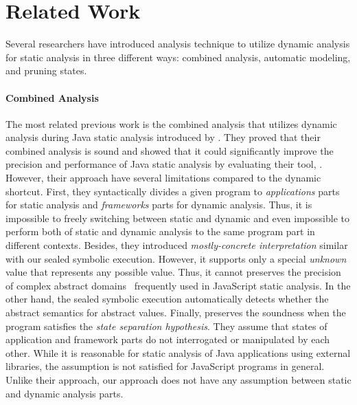\section{Related Work}\label{sec:related}

Several researchers have introduced analysis technique to utilize dynamic
analysis for static analysis in three different ways: combined analysis,
automatic modeling, and pruning states.


\paragraph{Combined Analysis}

The most related previous work is the combined analysis that utilizes dynamic
analysis during Java static analysis introduced by \citet{concerto}.  They
proved that their combined analysis is sound and showed that it could
significantly improve the precision and performance of Java static analysis by
evaluating their tool, \concerto.  However, their approach have several
limitations compared to the dynamic shortcut.  First, they syntactically divides
a given program to \textit{applications} parts for static analysis and
\textit{frameworks} parts for dynamic analysis.  Thus, it is impossible to
freely switching between static and dynamic and even impossible to perform both
of static and dynamic analysis to the same program part in different contexts.
Besides, they introduced \textit{mostly-concrete interpretation} similar with
our sealed symbolic execution.  However, it supports only a special
\textit{unknown} value that represents any possible value.  Thus, it cannot
preserves the precision of complex abstract domains~\cite{safe, tajs, regex,
weaklySPE} frequently used in JavaScript static analysis.  In the other hand,
the sealed symbolic execution automatically detects whether the abstract
semantics for abstract values.  Finally, \concerto preserves the soundness when
the program satisfies the \textit{state separation hypothesis}.  They assume
that states of application and framework parts do not interrogated or
manipulated by each other.  While it is reasonable for static analysis of Java
applications using external libraries, the assumption is not satisfied for
JavaScript programs in general.  Unlike their approach, our approach does not
have any assumption between static and dynamic analysis parts.


